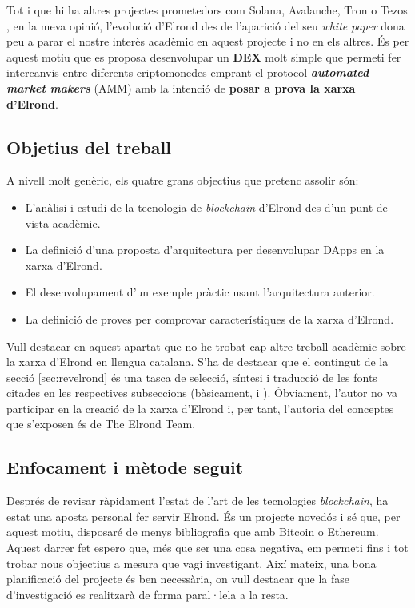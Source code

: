 \documentclass[11pt,a4paper]{article}
\begin{document}
Tot i que hi ha altres projectes prometedors com Solana, Avalanche, Tron o Tezos \cite{baro2021}, en la meva opinió, l'evolució d'Elrond des de l'aparició del seu \textit{white paper} dona peu a parar el nostre interès acadèmic en aquest projecte i no en els altres. És per aquest motiu que es proposa desenvolupar un \textbf{DEX} molt simple que permeti fer intercanvis entre diferents criptomonedes emprant el protocol \textbf{\textit{automated market makers}} (AMM) \cite{cryptopedia2021} amb la intenció de \textbf{posar a prova la xarxa d'Elrond}.

\subsection{Objetius del treball}\label{sub:objectius}
A nivell molt genèric, els quatre grans objectius que pretenc assolir són:
\begin{itemize}
    \item L'anàlisi i estudi de la tecnologia de \textit{blockchain} d'Elrond des d'un punt de vista acadèmic.
    \item La definició d'una proposta d'arquitectura per desenvolupar DApps en la xarxa d'Elrond.
    \item El desenvolupament d'un exemple pràctic usant l'arquitectura anterior.
    \item La definició de proves per comprovar característiques de la xarxa d'Elrond.
\end{itemize}

Vull destacar en aquest apartat que no he trobat cap altre treball acadèmic sobre la xarxa d'Elrond en llengua catalana. S'ha de destacar que el contingut de la secció \ref{sec:revelrond} és una tasca de selecció, síntesi i traducció de les fonts citades en les respectives subseccions (bàsicament, \cite{elrond2022} i \cite{elrond2019}). Òbviament, l'autor no va participar en la creació de la xarxa d'Elrond i, per tant, l'autoria del conceptes que s'exposen és de The Elrond Team. 

\subsection{Enfocament i mètode seguit}
Després de revisar ràpidament l'estat de l'art de les tecnologies \textit{blockchain}, ha estat una aposta personal fer servir Elrond. És un projecte novedós i sé que, per aquest motiu, disposaré de menys bibliografia que amb Bitcoin o Ethereum. Aquest darrer fet espero que, més que ser una cosa negativa, em permeti fins i tot trobar nous objectius a mesura que vagi investigant. Així mateix, una bona planificació del projecte és ben necessària, on vull destacar que la fase d'investigació es realitzarà de forma paral·lela a la resta.
\end{document}
